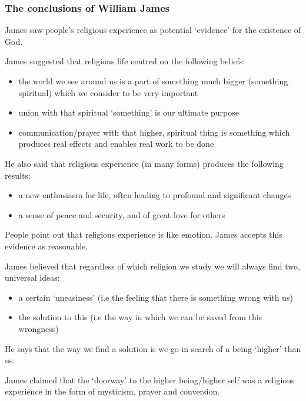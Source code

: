 \documentclass{article}
\begin{document}
\subsubsection*{The conclusions of William James}

James saw people's religious experience as potential `evidence' for the existence of God.

James suggested that religious life centred on the following beliefs:

\begin{itemize}
\item the world we see around us is a part of something much bigger (something spiritual) which we consider to be very important

\item union with that spiritual `something' is our ultimate purpose

\item communication/prayer with that higher, spiritual thing is something which produces real effects and enables real work to be done
\end{itemize}

He also said that religious experience (in many forms) produces the following results:

\begin{itemize}
\item a new enthusiasm for life, often leading to profound and significant changes

\item a sense of peace and security, and of great love for others
\end{itemize}

People point out that religious experience is like emotion.  James accepts this evidence as reasonable.

James believed that regardless of which religion we study we will always find two, universal ideas:

\begin{itemize}
\item a certain `uneasiness' (i.e the feeling that there is something wrong with us)

\item the solution to this (i.e the way in which we can be saved from this wrongness)
\end{itemize}

He says that the way we find a solution is we go in search of a being `higher' than us.

James claimed that the `doorway' to the higher being\slash higher self was a religious experience in the form of mysticism, prayer and conversion.
\end{document}
